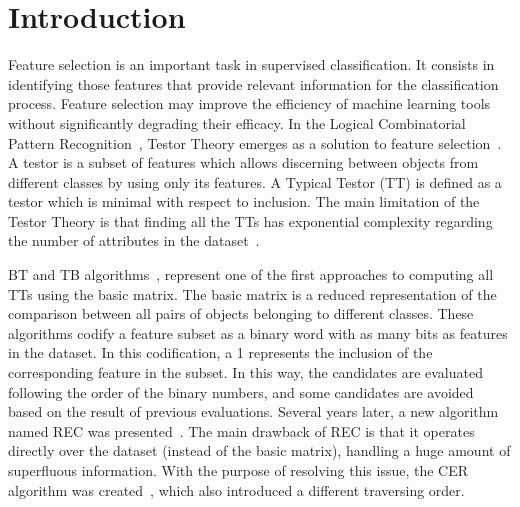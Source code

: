 \documentclass[citenumber]{llncs}
\begin{document}
\section{Introduction}
%
	Feature selection is an important task in supervised classification. It consists in identifying those features that provide relevant information for the classification process. Feature selection may improve the efficiency of machine learning tools without significantly degrading their efficacy.	In the Logical Combinatorial Pattern Recognition~\cite{Martinez2001}, Testor Theory emerges as a solution to feature selection~\cite{Lazo2001,Shulcloper2008}. A testor is a subset of features which allows discerning between objects from different classes by using only its features. A Typical Testor (TT) is defined as a testor which is minimal with respect to inclusion. The main limitation of the Testor Theory is that finding all the TTs has exponential complexity regarding the number of attributes in the dataset~\cite{Chikalov13}.
	
	BT and TB algorithms~\cite{Shulcloper1982}, represent one of the first approaches to computing all TTs using the basic matrix. The basic matrix is a reduced representation of the comparison between all pairs of objects belonging to different classes. These algorithms codify a feature subset as a binary word with as many bits as features in the dataset. In this codification, a 1 represents the inclusion of the corresponding feature in the subset. In this way, the candidates are evaluated following the order of the binary numbers, and some candidates are avoided based on the result of previous evaluations. Several years later, a new algorithm named REC was presented~\cite{Shulcloper1995b}. The main drawback of REC is that it operates directly over the dataset (instead of the	basic matrix), handling a huge amount of superfluous information. With the purpose of resolving this issue, the CER algorithm was created~\cite{Ayaquica1997}, which also introduced a different traversing order.
	
\end{document}
